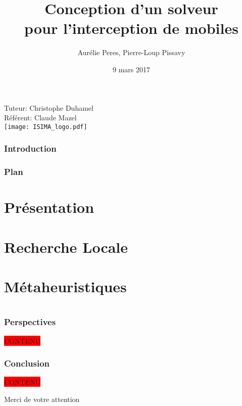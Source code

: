 \documentclass[xcolor=svgnames]{beamer}
\title[Interception de mobiles]{Conception d'un solveur\\ pour l'interception de mobiles}
\author[Aurélie Peres, Pierre-Loup Pissavy]{Aurélie Peres, Pierre-Loup Pissavy}
\institute{ISIMA -- 3\ieme{} année}
\date{9 mars 2017}
\newcommand{\TODO}[1]{\colorbox{red}{#1}}
\begin{document}
	\begin{frame}[plain] %
		\titlepage
		\begin{center}
			Tuteur: Christophe Duhamel\\[0.25cm]
			Référent: Claude Mazel\\[0.5cm]
			\texttt{[image: ISIMA\_logo.pdf]}
		\end{center}
	\end{frame}
	\begin{frame}[plain]
		\frametitle{Introduction}	
		\begin{center}
			
		\end{center}
	\end{frame}
	\begin{frame}
		\frametitle{Plan}
		\tableofcontents[hideallsubsections]
	\end{frame}
	\section{Présentation}
		

	\section{Recherche Locale}
		
	\section{Métaheuristiques}
        

	\section*{}
	\begin{frame}
		\frametitle{Perspectives}
		\TODO{CONTENU}
	\end{frame}
	\begin{frame}
		\frametitle{Conclusion}
		\TODO{CONTENU}
	\end{frame}
	\begin{frame}
		\begin{center}
			Merci de votre attention
		\end{center}
	\end{frame}
\end{document}
